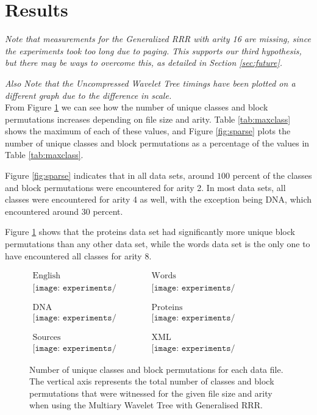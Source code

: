 \section{Results}
\label{sec:results}
\emph{Note that measurements for the Generalized RRR with arity 16 are missing, 
since the experiments took too long due to paging. This supports our third 
hypothesis, but there may be ways to overcome this, as detailed in Section 
\ref{sec:future}.}

\emph{Also Note that the Uncompressed Wavelet Tree timings have been plotted on 
a different graph due to the difference in scale.}\\



From Figure \ref{fig:unique} we can see how the number of unique classes and 
block permutations increases depending on file size and arity. Table 
\ref{tab:maxclass} shows the maximum of each of these values, and Figure 
\ref{fig:sparse} plots the number of unique classes and block permutations as
a percentage of the values in Table \ref{tab:maxclass}.

Figure \ref{fig:sparse} indicates that in all data sets, around $100$ percent of
the classes and block permutations were encountered for arity 2. In most data
sets, all classes were encountered for arity 4 as well, with the exception being 
DNA, which encountered around $30$ percent.

Figure \ref{fig:unique} shows that the proteins data set had significantly more
unique block permutations than any other data set, while the words data set is 
the only one to have encountered all classes for arity 8.

\begin{figure}[h]
\begin{center}
$\begin{array}{cc}
\mbox{English} & \mbox{Words} \\
\texttt{[image: experiments/unique\_english]} &
\texttt{[image: experiments/unique\_english\_ints]} \\ \\ \\
\mbox{DNA} & \mbox{Proteins} \\ 
\texttt{[image: experiments/unique\_dna]} &
\texttt{[image: experiments/unique\_proteins]} \\ \\ \\
\mbox{Sources} & \mbox{XML} \\
\texttt{[image: experiments/unique\_sources]} &
\texttt{[image: experiments/unique\_dblp\_xml]}
\end{array}$
\end{center}
\caption{Number of unique classes and block permutations for each data 
file. The vertical axis represents the total number of classes and block
permutations that were witnessed for the given file size and arity when using 
the Multiary Wavelet Tree with Generalised RRR.}
\label{fig:unique}
\end{figure}
	
